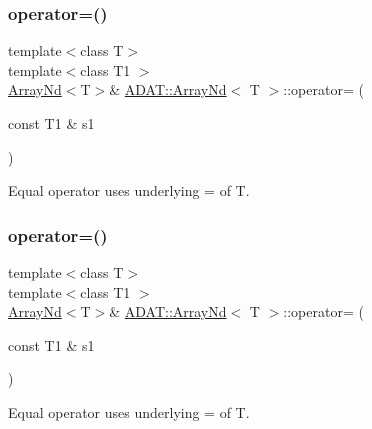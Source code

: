 \subsubsection{\texorpdfstring{operator=()}{operator=()}\hspace{0.1cm}{\footnotesize\ttfamily [13/15]}}
{\footnotesize\ttfamily template$<$class T$>$ \\
template$<$class T1 $>$ \\
\mbox{\hyperlink{classADAT_1_1ArrayNd}{Array\+Nd}}$<$T$>$\& \mbox{\hyperlink{classADAT_1_1ArrayNd}{A\+D\+A\+T\+::\+Array\+Nd}}$<$ T $>$\+::operator= (\begin{DoxyParamCaption}\item[{const T1 \&}]{s1 }\end{DoxyParamCaption})\hspace{0.3cm}{\ttfamily [inline]}}



Equal operator uses underlying = of T. 

\mbox{\label{classADAT_1_1ArrayNd_a4b2d8a768beccefe12844f27c50b058b}} 
\subsubsection{\texorpdfstring{operator=()}{operator=()}\hspace{0.1cm}{\footnotesize\ttfamily [14/15]}}
{\footnotesize\ttfamily template$<$class T$>$ \\
template$<$class T1 $>$ \\
\mbox{\hyperlink{classADAT_1_1ArrayNd}{Array\+Nd}}$<$T$>$\& \mbox{\hyperlink{classADAT_1_1ArrayNd}{A\+D\+A\+T\+::\+Array\+Nd}}$<$ T $>$\+::operator= (\begin{DoxyParamCaption}\item[{const T1 \&}]{s1 }\end{DoxyParamCaption})\hspace{0.3cm}{\ttfamily [inline]}}



Equal operator uses underlying = of T. 

\mbox{\label{classADAT_1_1ArrayNd_a4b2d8a768beccefe12844f27c50b058b}} 
